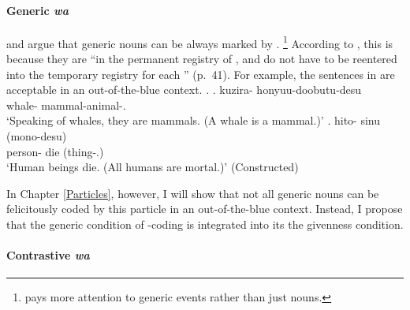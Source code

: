 \paragraph{Generic \textit{wa}}

 and  argue that
generic nouns can be always marked by .%
 \footnote{
  pays more attention to generic events rather than
 just nouns.
 }
According to ,
this is because they are ``in the permanent registry of ,
and do not have to be reentered into the temporary registry for each '' (p.~41).
For example, the sentences in \Next are acceptable in an out-of-the-blue context.
%
\ex.
 \ag. kuzira- honyuu-doobutu-desu \\
      whale- mammal-animal-. \\
      `Speaking of whales, they are mammals. (A whale is a mammal.)'
      \hfill{\cite[44]{kuno73}}
 \bg. hito- sinu (mono-desu) \\
      person- die (thing-.)\\
      `Human beings die. (All humans are mortal.)'
      \hfill{(Constructed)}


In Chapter \ref{Particles}, however,
I will show that not all generic nouns can be felicitously coded by this particle in an out-of-the-blue context.
Instead, I propose that
the generic condition of -coding is integrated into its
the givenness condition.


\paragraph{Contrastive \textit{wa}}

